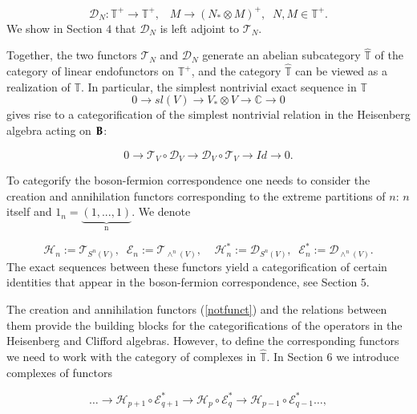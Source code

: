 \documentclass[11pt]{amsart}
\newcommand{\TT}{\mathbb{T}}
\newcommand {\Eps} {\mathcal {E}}
\begin{document}
\begin{equation}\label{anfunct}
 \mathcal{D}_N : \mathbb{T}^+ \rightarrow \mathbb{T}^+, \;\;\; M \rightarrow (N_* \otimes M)^+,\;\; N,M \in \mathbb{T}^+.\nonumber
\end{equation}
We show in Section $4$ that $ \mathcal{D}_N$ is left adjoint to $\mathcal{T}_N$.

Together, the two functors $\mathcal{T}_N$ and $\mathcal{D}_N$  generate an abelian subcategory $\widehat{\mathbb{T}}$ of the category
of linear endofunctors on $\TT^+$, and the category $\widehat{\mathbb{T}}$ can be viewed as a realization of $\mathbb T$. 
In particular, the simplest nontrivial exact sequence in ${\mathbb{T}}$
\begin{equation}\label{Halgebra1}
 0 \rightarrow sl(V)\rightarrow V_*\otimes V \rightarrow \mathbb C \rightarrow 0\nonumber
\end{equation}
gives rise to a categorification of the simplest nontrivial  
relation in the Heisenberg algebra acting on $\bold{B}$:

\begin{equation}\label{Halgebra}
 0 \rightarrow \mathcal{T}_V \circ \mathcal{D}_V \rightarrow \mathcal{D}_V \circ \mathcal{T}_V \rightarrow Id \rightarrow 0.
\end{equation}

To categorify the boson-fermion correspondence one needs to consider the creation and annihilation functors corresponding 
to the extreme partitions of $n$: $n$ itself and $1_n = \underbrace{(1,...,1)}_{\text{n}}$. We denote

\begin{equation}\label{notfunct}
 \mathcal{H}_n:=\mathcal{T}_{S^n(V)},\;\; \Eps_n:=\mathcal{T}_{\wedge^{n}(V)},\;\;\;\; \mathcal{H}^*_n:=\mathcal{D}_{S^n(V)},\;\; \Eps^*_n:=\mathcal{D}_{\wedge^n(V)}.
\end{equation}
The exact sequences between these functors yield a categorification of certain identities that appear in the boson-fermion
correspondence, see Section $5$.

The creation and annihilation functors (\ref{notfunct}) and the relations between them provide the building blocks for the
categorifications of the operators in the Heisenberg and Clifford algebras. However, to define the corresponding  functors
we need to work with the category of complexes in $\widehat{\mathbb{T}}$. In Section 6 we introduce complexes of functors

\begin{equation}\label{note1}
\dots \rightarrow \mathcal{H}_{p+1} \circ \Eps_{q+1}^* \rightarrow \mathcal{H}_{p} \circ \Eps_{q}^* \rightarrow \mathcal{H}_{p-1} \circ \Eps_{q-1}^* \dots, \nonumber
\end{equation}
\end{document}
